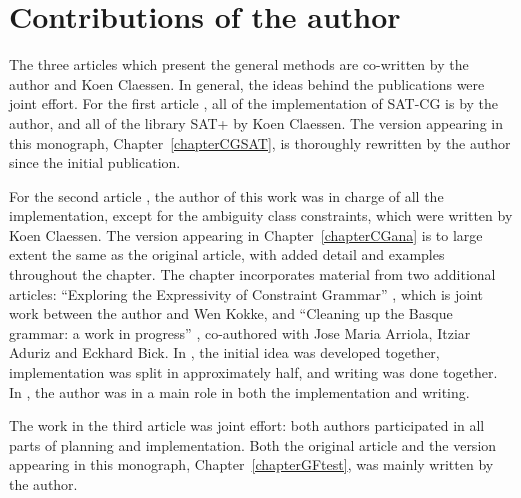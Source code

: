 \section{Contributions of the author}

The three articles which present the general methods \cite{listenmaa_claessen2015,listenmaa_claessen2016,listenmaa_claessen2018} are co-written by the author and Koen Claessen.
In general, the ideas behind the publications were joint effort.
For the first article \cite{listenmaa_claessen2015}, all of the implementation of SAT-CG is by the author,
and all of the library SAT+ by Koen Claessen.
The version appearing in this monograph, Chapter~\ref{chapterCGSAT}, is thoroughly rewritten by the author since the initial publication.

For the second article \cite{listenmaa_claessen2016}, the author of this work was in charge of all the implementation, except for the ambiguity class constraints, which were written by Koen Claessen. 
The version appearing in Chapter~\ref{chapterCGana} is to large extent the same as the original article, with added detail and examples throughout the chapter. The chapter incorporates material from two additional articles: ``Exploring the Expressivity of Constraint Grammar'' \cite{kokke2017expressivity}, which is joint work between the author and Wen Kokke, and ``Cleaning up the Basque grammar: a work in progress'' \cite{listenmaa2017basque}, co-authored with Jose Maria Arriola, Itziar Aduriz and Eckhard Bick. In \cite{kokke2017expressivity}, the initial idea was developed together, implementation was split in approximately half, and writing was done together. In \cite{listenmaa2017basque}, the author was in a main role in both the implementation and writing.

The work in the third article \cite{listenmaa_claessen2018} was joint effort: both authors participated in all parts of planning and implementation. Both the original article and the version appearing in this monograph, Chapter~\ref{chapterGFtest}, was mainly written by the author.


